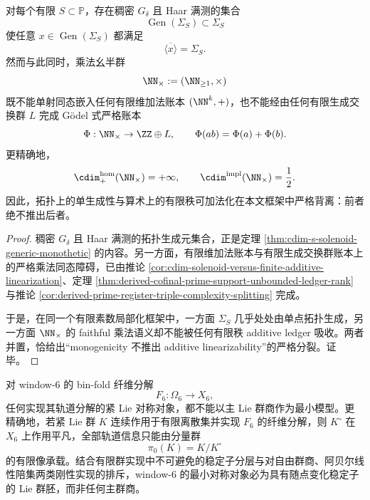 \begin{corollary}[单轨道致密生成与有限秩加法账本障碍的同体并存]\label{cor:derived-localized-phase-monogenicity-vs-finite-ledger-obstruction}
对每个有限 \(S\subset \mathbb P\)，存在稠密 \(G_\delta\) 且 Haar 满测的集合
\[
\operatorname{Gen}(\Sigma_S)\subset \Sigma_S
\]
使任意 \(x\in \operatorname{Gen}(\Sigma_S)\) 都满足
\[
\overline{\langle x\rangle}=\Sigma_S.
\]
然而与此同时，乘法幺半群
\[
\NN_{\times}:=(\NN_{\ge1},\times)
\]
既不能单射同态嵌入任何有限维加法账本 \((\NN^k,+)\)，也不能经由任何有限生成交换群 \(L\) 完成 Gödel 式严格账本
\[
\Phi:\NN_{\times}\to \ZZ\oplus L,
\qquad
\Phi(ab)=\Phi(a)+\Phi(b).
\]
更精确地，
\[
\cdim^{\mathrm{hom}}_{+}(\NN_{\times})=+\infty,
\qquad
\cdim^{\mathrm{impl}}(\NN_{\times})=\frac12.
\]
因此，拓扑上的单生成性与算术上的有限秩可加法化在本文框架中严格背离：前者绝不推出后者。
\end{corollary}

\begin{proof}
稠密 \(G_\delta\) 且 Haar 满测的拓扑生成元集合，正是定理 \ref{thm:cdim-s-solenoid-generic-monothetic} 的内容。另一方面，有限维加法账本与有限生成交换群账本上的严格乘法同态障碍，已由推论 \ref{cor:cdim-solenoid-versus-finite-additive-linearization}、定理 \ref{thm:derived-cofinal-prime-support-unbounded-ledger-rank} 与推论 \ref{cor:derived-prime-register-triple-complexity-splitting} 完成。

于是，在同一个有限素数局部化框架中，一方面 \(\Sigma_S\) 几乎处处由单点拓扑生成，另一方面 \(\NN_{\times}\) 的 faithful 乘法语义却不能被任何有限秩 additive ledger 吸收。两者并置，恰给出“monogenicity 不推出 additive linearizability”的严格分裂。证毕。
\end{proof}

\begin{theorem}[有限窗口对称的群胚强制]\label{thm:derived-window6-finite-symmetry-groupoid-forcing}
对 window-\(6\) 的 bin-fold 纤维分解
\[
F_6:\Omega_6\to X_6,
\]
任何实现其轨道分解的紧 Lie 对称对象，都不能以主 Lie 群商作为最小模型。更精确地，若紧 Lie 群 \(K\) 连续作用于有限离散集并实现 \(F_6\) 的纤维分解，则 \(K^\circ\) 在 \(X_6\) 上作用平凡，全部轨道信息只能由分量群
\[
\pi_0(K)=K/K^\circ
\]
的有限像承载。结合有限群实现中不可避免的稳定子分层与对自由群商、阿贝尔线性陪集两类刚性实现的排斥，window-\(6\) 的最小对称对象必为具有随点变化稳定子的 Lie 群胚，而非任何主群商。
\end{theorem}

